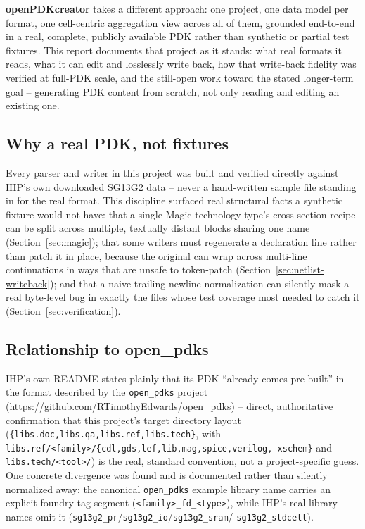 \documentclass[a4paper,11pt]{article}
\begin{document}
\textbf{openPDKcreator} takes a different approach: one project, one
data model per format, one cell-centric aggregation view across all
of them, grounded end-to-end in a real, complete, publicly available
PDK rather than synthetic or partial test fixtures. This report
documents that project as it stands: what real formats it reads,
what it can edit and losslessly write back, how that write-back
fidelity was verified at full-PDK scale, and the still-open work
toward the stated longer-term goal -- generating PDK content from
scratch, not only reading and editing an existing one.

\subsection{Why a real PDK, not fixtures}

Every parser and writer in this project was built and verified
directly against IHP's own downloaded SG13G2 data -- never a hand-written
sample file standing in for the real format. This discipline
surfaced real structural facts a synthetic fixture would not have:
that a single Magic technology type's cross-section recipe can be
split across multiple, textually distant blocks sharing one name
(Section~\ref{sec:magic}); that some writers must regenerate a
declaration line rather than patch it in place, because the original
can wrap across multi-line continuations in ways that are unsafe to
token-patch (Section~\ref{sec:netlist-writeback}); and that a naive
trailing-newline normalization can silently mask a real byte-level
bug in exactly the files whose test coverage most needed to catch it
(Section~\ref{sec:verification}).

\subsection{Relationship to open\_pdks}

IHP's own README states plainly that its PDK ``already comes
pre-built'' in the format described by the \texttt{open\_pdks}
project (\url{https://github.com/RTimothyEdwards/open_pdks}) --
direct, authoritative confirmation that this project's target
directory layout
(\texttt{\{libs.doc,libs.qa,libs.ref,libs.tech\}}, with
\texttt{libs.ref/<family>/\{cdl,gds,lef,lib,mag,spice,verilog,\allowbreak
xschem\}} and \texttt{libs.tech/<tool>/}) is the real, standard
convention, not a project-specific guess. One concrete divergence was
found and is documented rather than silently normalized away: the
canonical \texttt{open\_pdks} example library name carries an
explicit foundry tag segment (\texttt{<family>\_fd\_<type>}), while
IHP's real library names omit it
(\texttt{sg13g2\_pr}/\texttt{sg13g2\_io}/\texttt{sg13g2\_sram}/\allowbreak
\texttt{sg13g2\_stdcell}).
\end{document}
